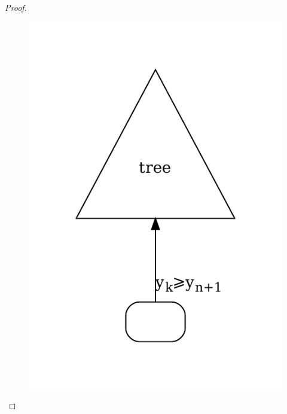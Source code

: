 \documentclass[12pt, a4paper]{article}
\begin{document}
\begin{proof}
\begin{description}
        \begin{figure}[h]
            \includegraphics[scale=0.7]{add.pdf}
            \centering
        \end{figure}
    \end{description}
\end{proof}
\end{document}
